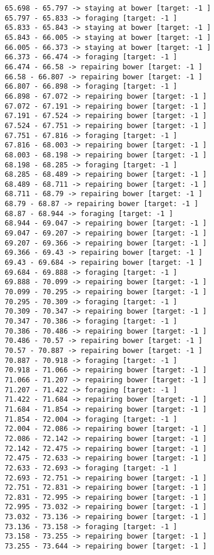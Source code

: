 \documentclass[11pt]{article}
\begin{document}
\begin{Verbatim}[commandchars=\\\{\}]
65.698 - 65.797 -> staying at bower [target: -1 ]
65.797 - 65.833 -> foraging [target: -1 ]
65.833 - 65.843 -> staying at bower [target: -1 ]
65.843 - 66.005 -> staying at bower [target: -1 ]
66.005 - 66.373 -> staying at bower [target: -1 ]
66.373 - 66.474 -> foraging [target: -1 ]
66.474 - 66.58 -> repairing bower [target: -1 ]
66.58 - 66.807 -> repairing bower [target: -1 ]
66.807 - 66.898 -> foraging [target: -1 ]
66.898 - 67.072 -> repairing bower [target: -1 ]
67.072 - 67.191 -> repairing bower [target: -1 ]
67.191 - 67.524 -> repairing bower [target: -1 ]
67.524 - 67.751 -> repairing bower [target: -1 ]
67.751 - 67.816 -> foraging [target: -1 ]
67.816 - 68.003 -> repairing bower [target: -1 ]
68.003 - 68.198 -> repairing bower [target: -1 ]
68.198 - 68.285 -> foraging [target: -1 ]
68.285 - 68.489 -> repairing bower [target: -1 ]
68.489 - 68.711 -> repairing bower [target: -1 ]
68.711 - 68.79 -> repairing bower [target: -1 ]
68.79 - 68.87 -> repairing bower [target: -1 ]
68.87 - 68.944 -> foraging [target: -1 ]
68.944 - 69.047 -> repairing bower [target: -1 ]
69.047 - 69.207 -> repairing bower [target: -1 ]
69.207 - 69.366 -> repairing bower [target: -1 ]
69.366 - 69.43 -> repairing bower [target: -1 ]
69.43 - 69.684 -> repairing bower [target: -1 ]
69.684 - 69.888 -> foraging [target: -1 ]
69.888 - 70.099 -> repairing bower [target: -1 ]
70.099 - 70.295 -> repairing bower [target: -1 ]
70.295 - 70.309 -> foraging [target: -1 ]
70.309 - 70.347 -> repairing bower [target: -1 ]
70.347 - 70.386 -> foraging [target: -1 ]
70.386 - 70.486 -> repairing bower [target: -1 ]
70.486 - 70.57 -> repairing bower [target: -1 ]
70.57 - 70.887 -> repairing bower [target: -1 ]
70.887 - 70.918 -> foraging [target: -1 ]
70.918 - 71.066 -> repairing bower [target: -1 ]
71.066 - 71.207 -> repairing bower [target: -1 ]
71.207 - 71.422 -> foraging [target: -1 ]
71.422 - 71.684 -> repairing bower [target: -1 ]
71.684 - 71.854 -> repairing bower [target: -1 ]
71.854 - 72.004 -> foraging [target: -1 ]
72.004 - 72.086 -> repairing bower [target: -1 ]
72.086 - 72.142 -> repairing bower [target: -1 ]
72.142 - 72.475 -> repairing bower [target: -1 ]
72.475 - 72.633 -> repairing bower [target: -1 ]
72.633 - 72.693 -> foraging [target: -1 ]
72.693 - 72.751 -> repairing bower [target: -1 ]
72.751 - 72.831 -> repairing bower [target: -1 ]
72.831 - 72.995 -> repairing bower [target: -1 ]
72.995 - 73.032 -> repairing bower [target: -1 ]
73.032 - 73.136 -> repairing bower [target: -1 ]
73.136 - 73.158 -> foraging [target: -1 ]
73.158 - 73.255 -> repairing bower [target: -1 ]
73.255 - 73.644 -> repairing bower [target: -1 ]

\end{Verbatim}
\end{document}
